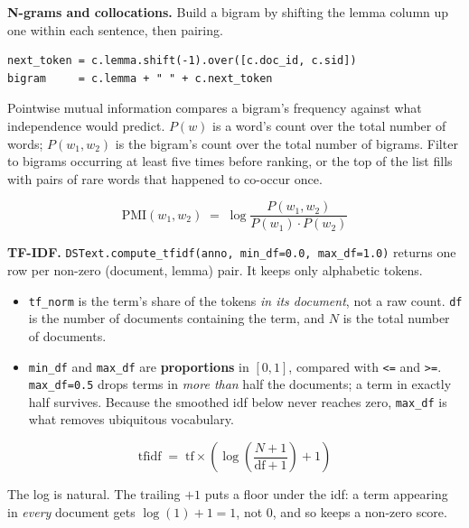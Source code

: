 \documentclass[11pt, a4paper]{article}
\newcommand{\code}[1]{\texttt{#1}}
\begin{document}
\smallskip

\textbf{N-grams and collocations.}
Build a bigram by shifting the lemma column up one within each sentence, then pairing.

\begin{verbatim}
next_token = c.lemma.shift(-1).over([c.doc_id, c.sid])
bigram     = c.lemma + " " + c.next_token
\end{verbatim}

Pointwise mutual information compares a bigram's frequency against what independence would
predict. $P(w)$ is a word's count over the total number of words; $P(w_1, w_2)$ is the
bigram's count over the total number of bigrams. Filter to bigrams occurring at least five
times before ranking, or the top of the list fills with pairs of rare words that happened to
co-occur once.

\begin{equation*}
\text{PMI}(w_1, w_2) \;=\; \log \frac{P(w_1, w_2)}{P(w_1) \cdot P(w_2)}
\end{equation*}

\smallskip

\textbf{TF-IDF.}
\code{DSText.compute\_tfidf(anno, min\_df=0.0, max\_df=1.0)} returns one row per non-zero
(document, lemma) pair. It keeps only alphabetic tokens.

\begin{itemize}
  \item \code{tf\_norm} is the term's share of the tokens \textit{in its document}, not a raw
        count. \code{df} is the number of documents containing the term, and $N$ is the total
        number of documents.
  \item \code{min\_df} and \code{max\_df} are \textbf{proportions} in $[0, 1]$, compared with
        \code{<=} and \code{>=}. \code{max\_df=0.5} drops terms in \textit{more than} half the
        documents; a term in exactly half survives. Because the smoothed idf below never
        reaches zero, \code{max\_df} is what removes ubiquitous vocabulary.
\end{itemize}

\begin{equation*}
\text{tfidf} \;=\; \text{tf} \times \left( \log\!\left( \frac{N + 1}{\text{df} + 1} \right) + 1 \right)
\end{equation*}

The log is natural. The trailing $+1$ puts a floor under the idf: a term appearing in
\textit{every} document gets $\log(1) + 1 = 1$, not $0$, and so keeps a non-zero score.
\end{document}
